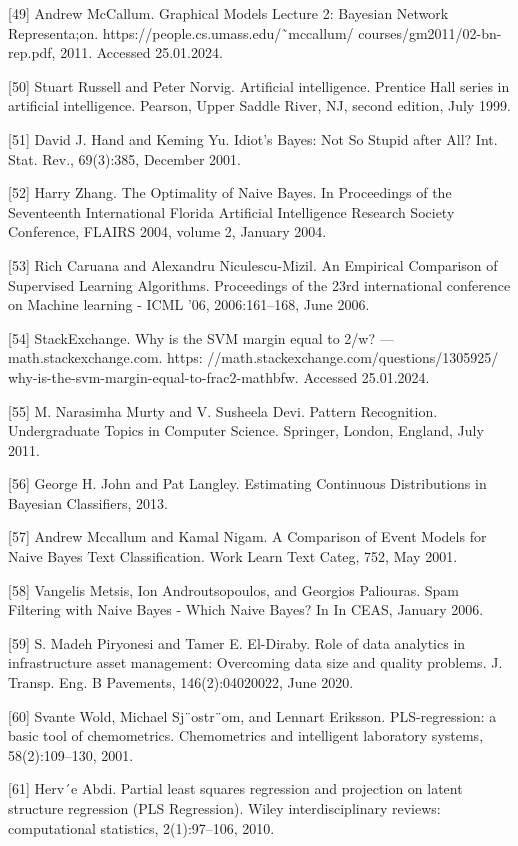 \documentclass[preprint,12pt]{elsarticle}
\begin{document}
[49] Andrew McCallum. Graphical Models Lecture 2: Bayesian Network Representa;on. https://people.cs.umass.edu/˜mccallum/ courses/gm2011/02-bn-rep.pdf, 2011. Accessed 25.01.2024. 

[50] Stuart Russell and Peter Norvig. Artificial intelligence. Prentice Hall series in artificial intelligence. Pearson, Upper Saddle River, NJ, second edition, July 1999. 

[51] David J. Hand and Keming Yu. Idiot’s Bayes: Not So Stupid after All? Int. Stat. Rev., 69(3):385, December 2001. 

[52] Harry Zhang. The Optimality of Naive Bayes. In Proceedings of the Seventeenth International Florida Artificial Intelligence Research Society Conference, FLAIRS 2004, volume 2, January 2004. 

[53] Rich Caruana and Alexandru Niculescu-Mizil. An Empirical Comparison of Supervised Learning Algorithms. Proceedings of the 23rd international conference on Machine learning - ICML ’06, 2006:161–168, June 2006. 

[54] StackExchange. Why is the SVM margin equal to 2/w? — math.stackexchange.com. https: //math.stackexchange.com/questions/1305925/ why-is-the-svm-margin-equal-to-frac2-mathbfw. Accessed 25.01.2024. 

[55] M. Narasimha Murty and V. Susheela Devi. Pattern Recognition. Undergraduate Topics in Computer Science. Springer, London, England, July 2011. 

[56] George H. John and Pat Langley. Estimating Continuous Distributions in Bayesian Classifiers, 2013. 

[57] Andrew Mccallum and Kamal Nigam. A Comparison of Event Models for Naive Bayes Text Classification. Work Learn Text Categ, 752, May 2001. 

[58] Vangelis Metsis, Ion Androutsopoulos, and Georgios Paliouras. Spam Filtering with Naive Bayes - Which Naive Bayes? In In CEAS, January 2006. 

[59] S. Madeh Piryonesi and Tamer E. El-Diraby. Role of data analytics in infrastructure asset management: Overcoming data size and quality problems. J. Transp. Eng. B Pavements, 146(2):04020022, June 2020. 

[60] Svante Wold, Michael Sj¨ostr¨om, and Lennart Eriksson. PLS-regression: a basic tool of chemometrics. Chemometrics and intelligent laboratory systems, 58(2):109–130, 2001. 

[61] Herv´e Abdi. Partial least squares regression and projection on latent structure regression (PLS Regression). Wiley interdisciplinary reviews: computational statistics, 2(1):97–106, 2010. 
\end{document}
